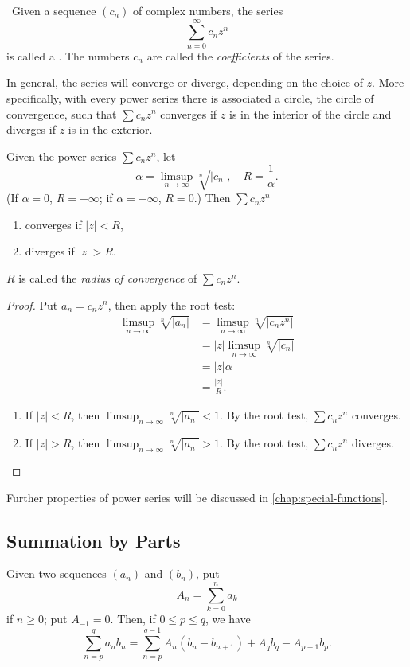 \begin{example} \
Given a sequence $(c_n)$ of complex numbers, the series
\[\sum_{n=0}^{\infty}c_nz^n\]
is called a . The numbers $c_n$ are called the \emph{coefficients} of the series.

In general, the series will converge or diverge, depending on the choice of $z$. More specifically, with every power series there is associated a circle, the circle of convergence, such that $\sum c_nz^n$ converges if $z$ is in the interior of the circle and diverges if $z$ is in the exterior.

\begin{proposition*}
Given the power series $\sum c_nz^n$, let
\[\alpha=\limsup_{n\to\infty}\sqrt[n]{|c_n|},\quad R=\frac{1}{\alpha}.\]
(If $\alpha=0$, $R=+\infty$; if $\alpha=+\infty$, $R=0$.) Then $\sum c_nz^n$
\begin{enumerate}[label=(\roman*)]
\item converges if $|z|<R$,
\item diverges if $|z|>R$.
\end{enumerate}
\end{proposition*}

$R$ is called the \emph{radius of convergence} of $\sum c_nz^n$.

\begin{proof}
Put $a_n=c_nz^n$, then apply the root test:
\begin{align*}
\limsup_{n\to\infty}\sqrt[n]{|a_n|}
&=\limsup_{n\to\infty}\sqrt[n]{|c_nz^n|}\\
&=|z|\limsup_{n\to\infty}\sqrt[n]{|c_n|}\\
&=|z|\alpha\\
&=\frac{|z|}{R}.
\end{align*}
\begin{enumerate}[label=(\roman*)]
\item If $|z|<R$, then $\displaystyle\limsup_{n\to\infty}\sqrt[n]{|a_n|}<1$. By the root test, $\sum c_nz^n$ converges.
\item If $|z|>R$, then $\displaystyle\limsup_{n\to\infty}\sqrt[n]{|a_n|}>1$. By the root test, $\sum c_nz^n$ diverges.
\end{enumerate}
\end{proof}

Further properties of power series will be discussed in \cref{chap:special-functions}.
\end{example}

\subsection{Summation by Parts}
\begin{proposition}
Given two sequences $(a_n)$ and $(b_n)$, put
\[A_n=\sum_{k=0}^{n}a_k\]
if $n\ge0$; put $A_{-1}=0$. Then, if $0\le p\le q$, we have
\[\sum_{n=p}^{q}a_nb_n=\sum_{n=p}^{q-1}A_n(b_n-b_{n+1})+A_qb_q-A_{p-1}b_p.\]
\end{proposition}

